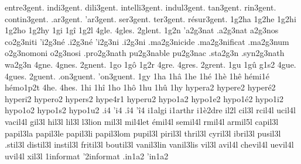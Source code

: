 {  entre3gent.
   indi3gent.
   dili3gent.
intelli3gent.
  indul3gent.
    tan3gent.
    rin3gent.
 contin3gent.
    .ar3gent.
    'ar3gent.
    ser3gent.
    ter3gent.
résur3gent.
%
1g2ha
1g2he
1g2hi
1g2ho
1g2hy
1gi
1gî
1g2l
4gle.
4gles.
2glent. %
    1g2n
  'a2g3nat     %
  .a2g3nat     %
   a2g3nos     %
  co2g3niti    %
  'i2g3né      %
  .i2g3né      %
  'i2g3ni      %
  .i2g3ni      %
 .ma2g3nicide  %
 .ma2g3nificat %
 .ma2g3num     %
   o2g3nomoni  %
   o2g3nosi    %
.pro2g3nath    %
  pu2g3nable   %
  pu2g3nac     %
.sta2g3n
.syn2g3nath    %
  wa2g3n
4gne.
4gnes.
2gnent. %
1go
1gô
1g2r
4gre.
4gres.
2grent. %
1gu
1gû
g1s2
4gue.
4gues.
   2guent.
.on3guent.
'on3guent.
%
1gy
1ha
1hâ
1he
1hé
1hè
1hê
                    hémi1é
                    hémo1p2t
4he.
4hes.
1hi
1hî
1ho
1hô
1hu
1hû
1hy
                    hypera2
                    hypere2
                    hyperé2
                    hyperi2
                    hypero2
                    hypers2
                    hype4r1
                    hyperu2
                    hypo1a2
                    hypo1e2 %
                    hypo1é2
                    hypo1i2
                    hypo1o2
                    hypo1s2
                    hypo1u2
.i4
'i4
.î4
'î4
                    i1algi
                    i1arthr
                    i1è2dre
    il2l
   cil3l
  rcil4l
  ucil4l
 vacil4l
   gil3l
   hil3l
   lil3l
     l3lion
   mil3l
   mil4let
  émil4l
 semil4l
  rmil4l
 armil5l
 capil3l
 papil3la
 papil3le
 papil3li
 papil3lom
 pupil3l
 piril3l
 thril3l
 cyril3l
 ibril3l
 pusil3l
 .stil3l
distil3l
instil3l
fritil3l
boutil3l
 vanil3lin
 vanil3lis
   vil3l
  avil4l
chevil4l
 uevil4l
  uvil4l
   xil3l
                    1informat %
                    '2informat
                    .in1a2
                    'in1a2
}

